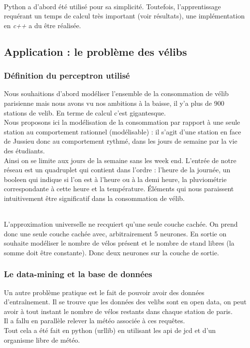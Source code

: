 \documentclass[a4paper, 11pt]{article}
\begin{document}
	\\Python a d'abord été utilisé pour sa simplicité. Toutefois, l'apprentissage requérant un temps de calcul très important (voir résultats), une implémentation en \emph{c++} a du être réalisée.
\subsection{Application : le problème des vélibs}
\subsubsection{Définition du perceptron utilisé}

Nous souhaitions d'abord modéliser l'ensemble de la consommation de vélib parisienne mais nous avons vu nos ambitions à la baisse, il y'a plus de 900 stations de velib.
En terme de calcul c'est gigantesque.
\\Nous proposons ici la modélisation de la consommation par rapport à une seule station au comportement rationnel (modélisable) : il s'agit d'une station en face de Jussieu donc au comportement rythmé, dans les jours de semaine par la vie des étudiants.
\\Ainsi on se limite aux jours de la semaine sans les week end. L'entrée de notre réseau est un quadruplet qui contient dans l'ordre : l'heure de la journée, un booleen qui indique si l'on est à l'heure ou à la demi heure, la pluviométrie correspondante à cette heure et la température. Éléments qui nous paraissent intuitivement être significatif dans la consommation de vélib.

\\L'approximation universelle ne recquiert qu'une seule couche cachée. On prend donc une seule couche cachée avec, arbitrairement 5 neurones. En sortie on souhaite modéliser le nombre de vélos présent et le nombre de stand libres (la somme doit être constante). Donc deux neurones sur la couche de sortie.

	\subsubsection{Le data-mining et la base de données}

Un autre problème pratique est le fait de pouvoir avoir des données d'entraînement.
Il se trouve que les données des velibs sont en open data, on peut avoir à tout instant le nombre de vélos restants dans chaque station de paris.
\\Il a fallu en parallèle relever la météo associée à ces requêtes.
\\Tout cela a été fait en python (urllib) en utilisant les api de jcd et d'un organisme libre de météo.
\end{document}
